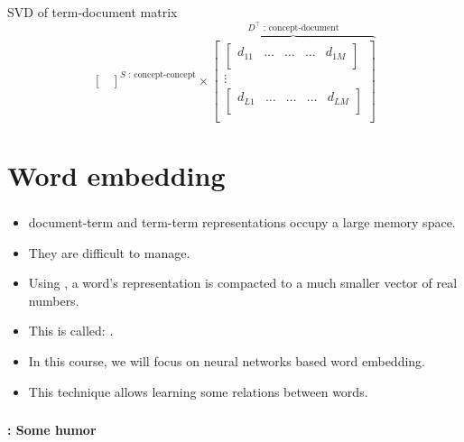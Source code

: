 \documentclass[xcolor=table]{beamer}
\begin{document}
\begin{frame}
\begin{block}{SVD of term-document matrix}
\[{\begin{bmatrix}
			\end{bmatrix}
		}^{S \text{ : concept-concept}}
		\times 
		\overbrace{
			\begin{bmatrix}
			\begin{bmatrix}
			d_{11} & \ldots & \ldots & \ldots & d_{1M} \\
			\end{bmatrix}\\
			\vdots \\
			\begin{bmatrix}
			d_{L1} & \ldots & \ldots & \ldots & d_{LM} \\
			\end{bmatrix}\\
			\end{bmatrix}
		}^{D^\top \text{ : concept-document}}
		\]
		
	\end{block}
	
\end{frame}


\section{Word embedding}

\begin{frame}
	\frametitle{\insertshortsubtitle}
	\framesubtitle{\insertsection}

	\begin{itemize}
		\item document-term and term-term representations occupy a large memory space.
		\item They are difficult to manage. 
		\item Using , a word's representation is compacted to a much smaller vector of real numbers.
		\item This is called: .
		\item In this course, we will focus on neural networks based word embedding.
		\item This technique allows learning some relations between words.
	\end{itemize}

\end{frame}


\begin{frame}
	\frametitle{\insertshortsubtitle}
	\framesubtitle{\insertsection: Some humor}
	
	\begin{center}
	\end{center}

\end{frame}
\end{document}
